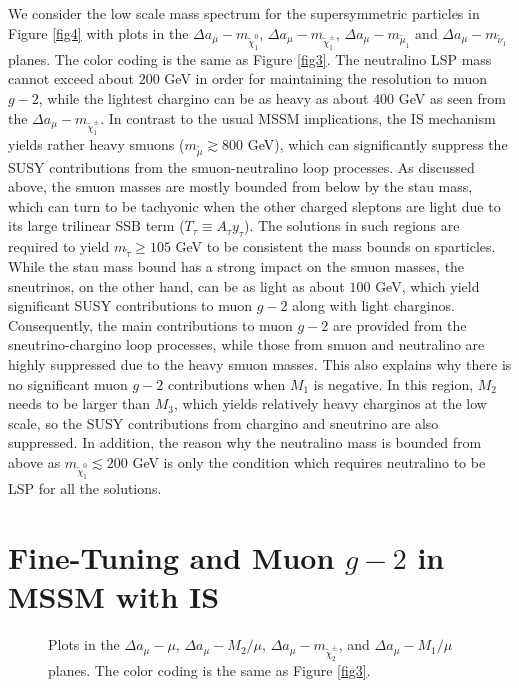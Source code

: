 \documentclass[12pt]{article}
\begin{document}
We consider the low scale mass spectrum for the supersymmetric particles in Figure \ref{fig4} with plots in the $\Delta a_{\mu}-m_{\tilde{\chi}_{1}^{0}}$, $\Delta a_{\mu}-m_{\tilde{\chi}_{1}^{\pm}}$, $\Delta a_{\mu}-m_{\tilde{\mu}_{1}}$ and $\Delta a_{\mu}-m_{\tilde{\nu}_{1}}$ planes. The color coding is the same as Figure \ref{fig3}. The neutralino LSP mass cannot exceed about $200$ GeV in order for maintaining the resolution to muon $g-2$, while the lightest chargino can be as heavy as about $400$ GeV as seen from the $\Delta a_{\mu}-m_{\tilde{\chi}_{1}^{\pm}}$. In contrast to the usual MSSM implications, the IS mechanism yields rather heavy smuons ($m_{\tilde{\mu}} \gtrsim 800$ GeV), which can significantly suppress the SUSY contributions from the smuon-neutralino loop processes. As discussed above, the smuon masses are mostly bounded from below by the stau mass, which can turn to be tachyonic when the other charged sleptons are light due to its large trilinear SSB term ($T_{\tau}\equiv A_{\tau}y_{\tau}$). The solutions in such regions are required to yield $m_{\tilde{\tau}} \geq 105$ GeV to be consistent the mass bounds on sparticles. While the stau mass bound has a strong impact on the smuon masses, the sneutrinos, on the other hand, can be as light as about $100$ GeV, which yield significant SUSY contributions to muon $g-2$ along with light charginos. Consequently, the main contributions to muon $g-2$ are provided from the sneutrino-chargino loop processes, while those from smuon and neutralino are highly suppressed due to the heavy smuon masses. This also explains why there is no significant muon $g-2$ contributions when $M_{1}$ is negative. In this region, $M_{2}$ needs to be larger than $M_{3}$, which yields relatively heavy charginos at the low scale, so the SUSY contributions from chargino and sneutrino are also suppressed. In addition, the reason why the neutralino mass is bounded from above as $m_{\tilde{\chi}_{1}^{0}} \lesssim 200$ GeV is only the condition which requires neutralino to be LSP for all the solutions.




\section{Fine-Tuning and Muon $g-2$ in MSSM with IS}
\label{sec:FTg2}

\begin{figure}[ht!]
\centering
{}
\caption{Plots in the $\Delta a_{\mu}-\mu$, $\Delta a_{\mu}-M_{2}/\mu$, $\Delta a_{\mu}-m_{\tilde{\chi}_{2}^{\pm}}$, and $\Delta a_{\mu}-M_{1}/\mu$ planes. The color coding is the same as Figure \ref{fig3}.}
\label{fig5}
\end{figure}
\end{document}
